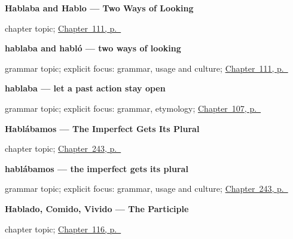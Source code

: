 \noindent\begin{minipage}[t]{\linewidth}
\raggedright
\textbf{Hablaba and Hablo --- Two Ways of Looking}\par
\footnotesize chapter topic; \hyperref[ch:aspect-not-time]{Chapter~111, p.~\pageref*{ch:aspect-not-time}}
\end{minipage}\par\smallskip

\noindent\begin{minipage}[t]{\linewidth}
\raggedright
\textbf{hablaba and habló — two ways of looking}\par
\footnotesize grammar topic; explicit focus: grammar, usage and culture; \hyperref[ch:aspect-not-time]{Chapter~111, p.~\pageref*{ch:aspect-not-time}}
\end{minipage}\par\smallskip

\noindent\begin{minipage}[t]{\linewidth}
\raggedright
\textbf{hablaba — let a past action stay open}\par
\footnotesize grammar topic; explicit focus: grammar, etymology; \hyperref[ch:spanish-imperfecto]{Chapter~107, p.~\pageref*{ch:spanish-imperfecto}}
\end{minipage}\par\smallskip

\noindent\begin{minipage}[t]{\linewidth}
\raggedright
\textbf{Hablábamos --- The Imperfect Gets Its Plural}\par
\footnotesize chapter topic; \hyperref[ch:hablabamos]{Chapter~243, p.~\pageref*{ch:hablabamos}}
\end{minipage}\par\smallskip

\noindent\begin{minipage}[t]{\linewidth}
\raggedright
\textbf{hablábamos — the imperfect gets its plural}\par
\footnotesize grammar topic; explicit focus: grammar, usage and culture; \hyperref[ch:hablabamos]{Chapter~243, p.~\pageref*{ch:hablabamos}}
\end{minipage}\par\smallskip

\noindent\begin{minipage}[t]{\linewidth}
\raggedright
\textbf{Hablado, Comido, Vivido --- The Participle}\par
\footnotesize chapter topic; \hyperref[ch:participle]{Chapter~116, p.~\pageref*{ch:participle}}
\end{minipage}\par\smallskip

